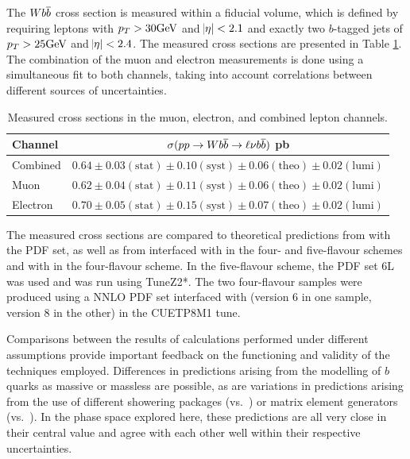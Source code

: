 The $W b\overline{b}$ cross section is measured within a fiducial volume, which is defined by
requiring leptons with $p_T > 30\mathrm{GeV}$ and $\abs{\eta}<2.1$ and exactly two $b$-tagged jets of
 $p_T > 25\mathrm{GeV}$ and $\abs{\eta}<2.4$.
The measured cross sections are presented in Table \ref{tab:crosssections}.
The combination of the muon and electron measurements is done using a simultaneous fit to both channels,
 taking into account correlations between different sources of uncertainties.

\begin{table}[!h]
\begin{center}
\caption{
 Measured cross sections in the muon, electron, and combined lepton channels.}
\label{tab:crosssections}
 \begin{tabular}{l|c}
 Channel        & $\sigma(pp\rightarrow Wb\overline{b}\rightarrow\ell\nu b\overline{b})$ pb \\
\hline
 Combined & $  0.64 \pm 0.03 \mathrm{(stat)} \pm 0.10 \mathrm{(syst)} \pm 0.06 \mathrm{(theo)} \pm 0.02 \mathrm{(lumi)} $ \\
\hline 
     Muon & $  0.62 \pm 0.04 \mathrm{(stat)} \pm 0.11 \mathrm{(syst)} \pm 0.06 \mathrm{(theo)} \pm 0.02 \mathrm{(lumi)} $ \\
 Electron & $  0.70 \pm 0.05 \mathrm{(stat)} \pm 0.15 \mathrm{(syst)} \pm 0.07 \mathrm{(theo)} \pm 0.02 \mathrm{(lumi)} $ \\
 \end{tabular}
\end{center}
\end{table}



% 
The measured cross sections are compared to theoretical predictions from
 \MCFM \cite{Campbell:2010ff, Badger:2010mg}
 with the {} PDF set, as well as from
 interfaced with \PYTHIAs in the four- and five-flavour schemes and
  with \PYTHIAe \cite{ref:Pythia8} in the four-flavour scheme.
In the five-flavour scheme, the PDF set {\CTEQ6L} was
 used and \PYTHIAs was run using {TuneZ2*}.
The two four-flavour samples were produced using
 a NNLO PDF set interfaced with %
 \PYTHIA (version 6 in one sample, version 8 in the other)
 in the {CUETP8M1} tune.

Comparisons between the results of calculations performed
 under different assumptions provide important feedback
 on the functioning and validity of the techniques employed.
Differences in predictions arising from the modelling of
 $b$ quarks as massive or massless are possible, as are
 variations in predictions arising from the use of different
 showering packages (\PYTHIAs vs.\ \PYTHIAe) or matrix element
 generators (\MADGRAPH vs.\ \MCFM).
In the phase space explored here, these predictions are all
 very close in their central value and agree with each other
 well within their respective uncertainties.

